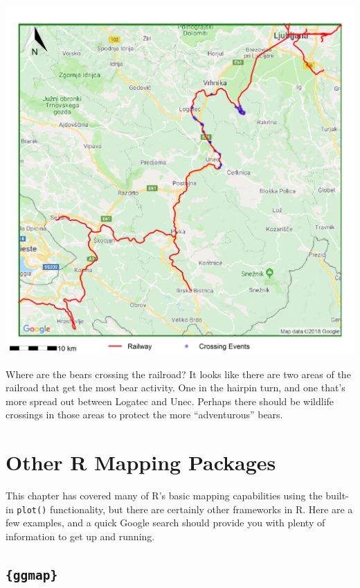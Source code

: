 \documentclass[]{book}
\theoremstyle{definition}
\theoremstyle{definition}
\theoremstyle{definition}
\theoremstyle{remark}
\begin{document}
\begin{center}\includegraphics[width=41.67in]{img/FinalMap} \end{center}

Where are the bears crossing the railroad? It looks like there are two
areas of the railroad that get the most bear activity. One in the
hairpin turn, and one that's more spread out between Logatec and Unec.
Perhaps there should be wildlife crossings in those areas to protect the
more ``adventurous'' bears.

\section{Other R Mapping Packages}\label{other-r-mapping-packages}

This chapter has covered many of R's basic mapping capabilities using
the built-in \texttt{plot()} functionality, but there are certainly
other frameworks in R. Here are a few examples, and a quick Google
search should provide you with plenty of information to get up and
running.

\subsection{\texorpdfstring{\texttt{\{ggmap\}}}{\{ggmap\}}}\label{ggmap}
\end{document}
